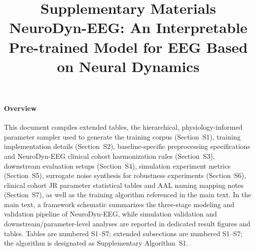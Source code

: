 \documentclass[11pt]{article}
\title{\textbf{Supplementary Materials}\\\large NeuroDyn-EEG: An Interpretable Pre-trained Model for EEG Based on Neural Dynamics}
\date{}
\begin{document}
\renewcommand{\thefigure}{S\arabic{figure}}
\renewcommand{\thetable}{S\arabic{table}}
\renewcommand{\thealgorithm}{S\arabic{algorithm}}
\renewcommand{\tablename}{Supplementary Table}

\maketitle

\paragraph{Overview}

This document compiles extended tables, the hierarchical, physiology-informed parameter sampler used to generate the training corpus (Section~S1), training implementation details (Section~S2), baseline-specific preprocessing specifications and NeuroDyn-EEG clinical cohort harmonization rules (Section~S3), downstream evaluation setups (Section~S4), simulation experiment metrics (Section~S5), surrogate noise synthesis for robustness experiments (Section~S6), clinical cohort JR parameter statistical tables and AAL naming mapping notes (Section~S7), as well as the training algorithm referenced in the main text. In the main text, a framework schematic summarizes the three-stage modeling and validation pipeline of NeuroDyn-EEG, while simulation validation and downstream/parameter-level analyses are reported in dedicated result figures and tables. Tables are numbered S1--S7; extended subsections are numbered S1--S7; the algorithm is designated as Supplementary Algorithm~S1.

\end{document}
